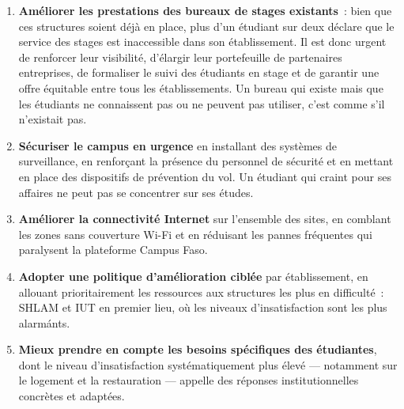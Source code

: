 \documentclass[
12pt,          %
a4paper,       %
oneside,      %
openright      %
]{report}          %
\begin{document}
	\begin{enumerate}[label=\textbf{R\arabic*.},
		leftmargin=2.5em]
		
		\item \textbf{Am\'eliorer les prestations des
			bureaux de stages existants}~: bien que ces
		structures soient d\'ej\`a en place, plus d'un
		\'etudiant sur deux d\'eclare que le service
		des stages est inaccessible dans son
		\'etablissement. Il est donc urgent de renforcer
		leur visibilit\'e, d'\'elargir leur portefeuille
		de partenaires entreprises, de formaliser le
		suivi des \'etudiants en stage et de garantir
		une offre \'equitable entre tous les
		\'etablissements. Un bureau qui existe mais
		que les \'etudiants ne connaissent pas ou ne
		peuvent pas utiliser, c'est comme s'il
		n'existait pas.
		\item \textbf{S\'ecuriser le campus en urgence}
		en installant des syst\`emes de surveillance,
		en renfor\c{c}ant la pr\'esence du personnel
		de s\'ecurit\'e et en mettant en place des
		dispositifs de pr\'evention du vol. Un
		\'etudiant qui craint pour ses affaires ne
		peut pas se concentrer sur ses \'etudes.
		\item \textbf{Am\'eliorer la connectivit\'e
			Internet} sur l'ensemble des sites, en
		comblant les zones sans couverture Wi-Fi et
		en r\'eduisant les pannes fr\'equentes qui
		paralysent la plateforme Campus Faso.
		\item \textbf{Adopter une politique
			d'am\'elioration cibl\'ee} par \'etablissement,
		en allouant prioritairement les ressources
		aux structures les plus en difficult\'e~:
		SHLAM et IUT en premier lieu, o\`u les
		niveaux d'insatisfaction sont les plus
		alarm\'ants.
		\item \textbf{Mieux prendre en compte les
			besoins sp\'ecifiques des \'etudiantes}, dont
		le niveau d'insatisfaction syst\'ematiquement
		plus \'elev\'e --- notamment sur le logement
		et la restauration --- appelle des r\'eponses
		institutionnelles concr\`etes et adapt\'ees.
		
	\end{enumerate}
	
	
		
		
\cleardoublepage
{}
\nocite{*}
\appendix
\cleardoublepage
\end{document}
